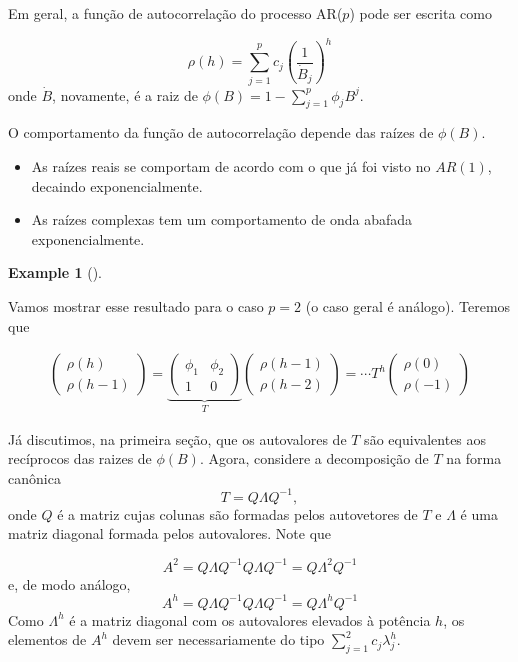\documentclass[
  letterpaper,
  DIV=11,
  numbers=noendperiod]{scrartcl}
\theoremstyle{definition}
\newtheorem{example}{Example}[chapter]
\theoremstyle{definition}
\theoremstyle{plain}
\theoremstyle{plain}
\theoremstyle{remark}
\begin{document}
Em geral, a função de autocorrelação do processo AR(\(p\)) pode ser
escrita como

\[\rho(h)=\sum_{j=1}^p c_j\left(\frac{1}{\dot{B}_j}\right)^h\] onde
\(\dot{B}\), novamente, é a raiz de
\(\phi(B)=1-\sum_{j=1}^p \phi_j B^j\).

O comportamento da função de autocorrelação depende das raízes de
\(\phi(B)\).

\begin{itemize}
\item
  As raízes reais se comportam de acordo com o que já foi visto no
  \(AR(1)\), decaindo exponencialmente.
\item
  As raízes complexas tem um comportamento de onda abafada
  exponencialmente.
\end{itemize}

\begin{example}[]\protect\hypertarget{exm-}{}\label{exm-}

Vamos mostrar esse resultado para o caso \(p=2\) (o caso geral é
análogo). Teremos que

\begin{align}
\left(\begin{array}{c}\rho(h)\\ \rho(h-1)\end{array}\right)=\underbrace{\left(\begin{array}{cc}\phi_1 & \phi_2 \\ 1 & 0 \end{array}\right)}_{T}\left(\begin{array}{c}\rho(h-1)\\ \rho(h-2)\end{array}\right)=\cdots T^h\left(\begin{array}{c}\rho(0)\\ \rho(-1)\end{array}\right)\end{align}

Já discutimos, na primeira seção, que os autovalores de \(T\) são
equivalentes aos recíprocos das raizes de \(\phi(B)\). Agora, considere
a decomposição de \(T\) na forma canônica \[T=Q\Lambda Q^{-1},\] onde
\(Q\) é a matriz cujas colunas são formadas pelos autovetores de \(T\) e
\(\Lambda\) é uma matriz diagonal formada pelos autovalores. Note que

\[A^2=Q\Lambda Q^{-1}Q\Lambda Q^{-1}=Q\Lambda^2 Q^{-1}\] e, de modo
análogo, \[A^h=Q\Lambda Q^{-1}Q\Lambda Q^{-1}=Q\Lambda^h Q^{-1}\] Como
\(\Lambda^h\) é a matriz diagonal com os autovalores elevados à potência
\(h\), os elementos de \(A^h\) devem ser necessariamente do tipo
\(\sum_{j=1}^2 c_j \lambda_j^h\).


\end{example}
\end{document}
